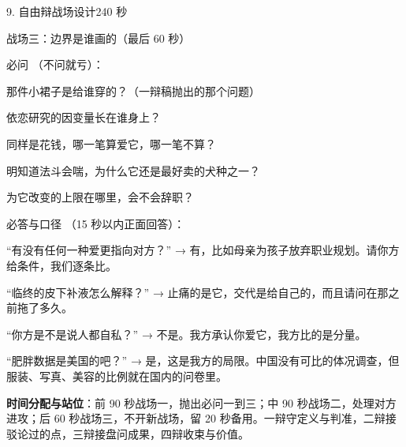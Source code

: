 \documentclass[script,con]{debate}
\begin{document}
\begin{stage}{9. 自由辩战场设计}{240 秒}
\begin{battleground}{战场三：边界是谁画的（最后 60 秒）}
\begin{bullets}
\end{bullets}
\begin{points}{必问 （不问就亏）：}
\item 那件小裙子是给谁穿的？（一辩稿抛出的那个问题）
\item 依恋研究的因变量长在谁身上？
\item 同样是花钱，哪一笔算爱它，哪一笔不算？
\item 明知道法斗会喘，为什么它还是最好卖的犬种之一？
\item 为它改变的上限在哪里，会不会辞职？
\end{points}
\begin{points}{必答与口径 （15 秒以内正面回答）：}
\item “有没有任何一种爱更指向对方？” → 有，比如母亲为孩子放弃职业规划。请你方给条件，我们逐条比。
\item “临终的皮下补液怎么解释？” → 止痛的是它，交代是给自己的，而且请问在那之前拖了多久。
\item “你方是不是说人都自私？” → 不是。我方承认你爱它，我方比的是分量。
\item “肥胖数据是美国的吧？” → 是，这是我方的局限。中国没有可比的体况调查，但服装、写真、美容的比例就在国内的问卷里。
\end{points}
\textbf{时间分配与站位}：前 90 秒战场一，抛出必问一到三；中 90 秒战场二，处理对方进攻；后 60 秒战场三，不开新战场，留 20 秒备用。一辩守定义与判准，二辩接驳论过的点，三辩接盘问成果，四辩收束与价值。

\end{battleground}
\end{stage}
\end{document}
